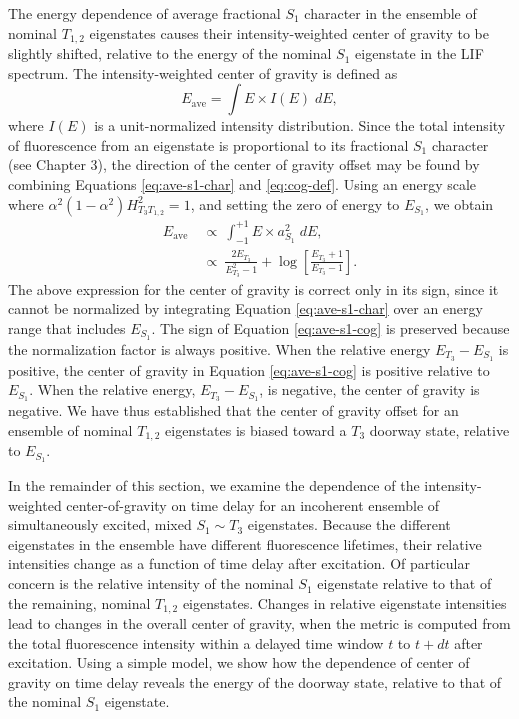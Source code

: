 The energy dependence of average fractional $S_1$ character in the
ensemble of nominal $T_{1,2}$ eigenstates causes their
intensity-weighted center of gravity to be slightly shifted, relative
to the energy of the nominal $S_1$ eigenstate in the LIF spectrum.
The intensity-weighted center of gravity is defined as
\begin{equation}
  \label{eq:cog-def}
  E_{\text{ave}} = \int E \times I(E) \; dE,
\end{equation}
where $I(E)$ is a unit-normalized intensity distribution.  Since the
total intensity of fluorescence from an eigenstate is proportional to
its fractional $S_1$ character (see Chapter 3), the direction of the
center of gravity offset may be found by combining Equations
\ref{eq:ave-s1-char} and \ref{eq:cog-def}.  Using an energy scale
where $\alpha^2 (1-\alpha^2) H_{T_3T_{1,2}}^2 = 1$, and setting the
zero of energy to $E_{S_1}$, we obtain
\begin{equation}
  \label{eq:ave-s1-cog}
  \begin{split}
    E_{\text{ave}} \: 
    &\propto \: \int_{-1}^{+1} E \times a_{S_1}^2 \; dE,\\
    &\propto \: \frac{2 E_{T_3}}{E_{T_3}^2 - 1} + \log
    \left[
      \frac{E_{T_3}+1}{E_{T_3}-1}
    \right].
  \end{split}
\end{equation}
The above expression for the center of gravity is correct only in its
sign, since it cannot be normalized by integrating Equation
\ref{eq:ave-s1-char} over an energy range that includes $E_{S_1}$.
The sign of Equation \ref{eq:ave-s1-cog} is preserved because the
normalization factor is always positive.  When the relative energy
$E_{T_3} - E_{S_1}$ is positive, the center of gravity in Equation
\ref{eq:ave-s1-cog} is positive relative to $E_{S_1}$.  When the
relative energy, $E_{T_3} - E_{S_1}$, is negative, the center of
gravity is negative.  We have thus established that the center of
gravity offset for an ensemble of nominal $T_{1,2}$ eigenstates is
biased toward a $T_3$ doorway state, relative to $E_{S_1}$.

In the remainder of this section, we examine the dependence of the
intensity-weighted center-of-gravity on time delay for an incoherent
ensemble of simultaneously excited, mixed $S_1 \sim T_3$ eigenstates.
Because the different eigenstates in the ensemble have different
fluorescence lifetimes, their relative intensities change as a
function of time delay after excitation.  Of particular concern is the
relative intensity of the nominal $S_1$ eigenstate relative to that of
the remaining, nominal $T_{1,2}$ eigenstates.  Changes in relative
eigenstate intensities lead to changes in the overall center of
gravity, when the metric is computed from the total fluorescence
intensity within a delayed time window $t$ to $t+dt$ after excitation.
Using a simple model, we show how the dependence of center of gravity
on time delay reveals the energy of the doorway state, relative to
that of the nominal $S_1$ eigenstate.



